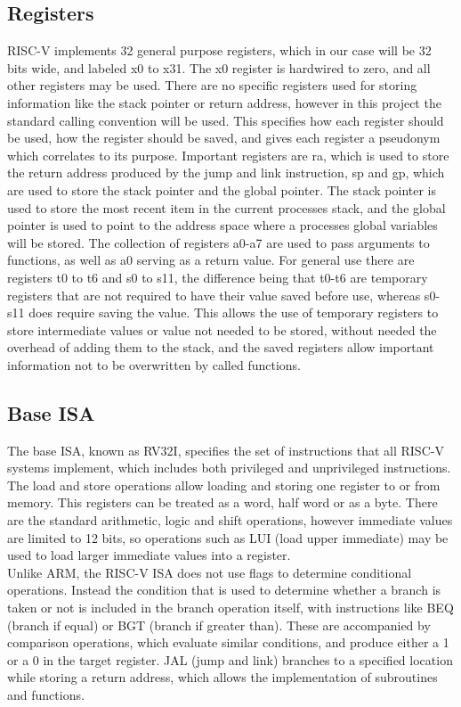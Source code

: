 \subsection{Registers}
RISC-V implements 32 general purpose registers, which in our case will be 32 bits wide, and labeled x0 to x31. The x0 register is hardwired to zero, and all other registers may be used. There are no specific registers used for storing information like the stack pointer or return address, however in this project the standard calling convention will be used. This specifies how each register should be used, how the register should be saved, and gives each register a pseudonym which correlates to its purpose. Important registers are ra, which is used to store the return address produced by the jump and link instruction, sp and gp, which are used to store the stack pointer and the global pointer. The stack pointer is used to store the most recent item in the current processes stack, and the global pointer is used to point to the address space where a processes global variables will be stored. The collection of registers a0-a7 are used to pass arguments to functions, as well as a0 serving as a return value. For general use there are registers t0 to t6 and s0 to s11, the difference being that t0-t6 are temporary registers that are not required to have their value saved before use, whereas s0-s11 does require saving the value. This allows the use of temporary registers to store intermediate values or value not needed to be stored, without needed the overhead of adding them to the stack, and the saved registers allow important information not to be overwritten by called functions.\cite{riscv_unpriv}
\subsection{Base ISA}
The base ISA, known as RV32I, specifies the set of instructions that all RISC-V systems implement, which includes both privileged and unprivileged instructions. The load and store operations allow loading and storing one register to or from memory. This registers can be treated as a word, half word or as a byte. There are the standard arithmetic, logic and shift operations, however immediate values are limited to 12 bits, so operations such as LUI (load upper immediate) may be used to load larger immediate values into a register.\\
Unlike ARM, the RISC-V ISA does not use flags to determine conditional operations. Instead the condition that is used to determine whether a branch is taken or not is included in the branch operation itself, with instructions like BEQ (branch if equal) or BGT (branch if greater than). These are accompanied by comparison operations, which evaluate similar conditions, and produce either a 1 or a 0 in the target register. JAL (jump and link) branches to a specified location while storing a return address, which allows the implementation of subroutines and functions.\cite{riscv_unpriv}
